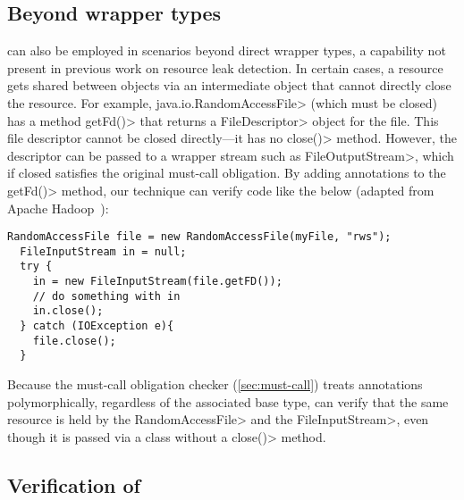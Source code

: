 
\subsection{Beyond wrapper types}

\MustCallAlias can also be employed in scenarios beyond direct wrapper types, a
capability not present in previous work on resource leak detection.  In certain cases, a resource gets
shared between objects via an intermediate object that cannot directly close the
resource.  For example, \<java.io.RandomAccessFile> (which must be closed) has
a method \<getFd()> that returns a \<FileDescriptor>
object for the file. This file
descriptor cannot be closed directly---it has no \<close()> method.
However, the descriptor can be passed to a wrapper stream such as
\<FileOutputStream>, which if closed satisfies the original must-call
obligation.  By adding \MustCallAlias annotations to the \<getFd()> method, our
technique can verify code like the below (adapted from Apache Hadoop~\cite{hadoop-random-access-file}):
\begin{lstlisting}[frame=tb,belowskip=3mm]
  RandomAccessFile file = new RandomAccessFile(myFile, "rws");
  FileInputStream in = null;
  try {
    in = new FileInputStream(file.getFD());
    // do something with in  
    in.close();
  } catch (IOException e){
    file.close();
  }
\end{lstlisting}
Because the must-call obligation checker (\cref{sec:must-call})
treats \MustCallAlias annotations
polymorphically, regardless of the associated base type,
\tool can verify that the same resource is held by
the \<Random\-Access\-File> and the \<File\-Input\-Stream>, even though it
is passed via a class without a \<close()> method.

\subsection{Verification of \MustCallAlias}\label{sec:MustCallAlias-verification}

